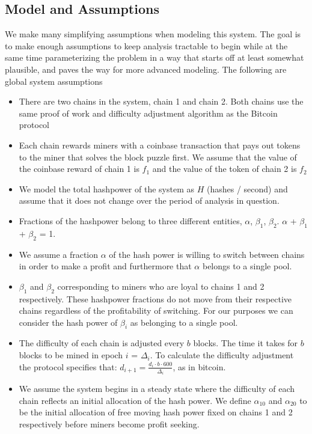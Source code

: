 \documentclass[12pt]{article}
\begin{document}
\subsection*{Model and Assumptions}
We make many simplifying assumptions when modeling this system.  The goal is to make enough assumptions to keep analysis tractable to begin while at the same time parameterizing the problem in a way that starts off at least somewhat plausible, and paves the way for more advanced modeling.  The following are global system assumptions 
\begin{itemize}
\item
There are two chains in the system, chain 1 and chain 2.  Both chains use the same proof of work and difficulty adjustment algorithm as the Bitcoin protocol
\item
Each chain rewards miners with a coinbase transaction that pays out tokens to the miner that solves the block puzzle first.  We assume that the value of the coinbase reward of chain 1 is $f_1$ and the value of the token of chain 2 is $f_2$
\item
We model the total hashpower of the system as $H$ (hashes / second) and assume that it does not change over the period of analysis in question.  
\item
Fractions of the hashpower belong to three different entities, $\alpha$, $\beta_1$, $\beta_2$.  $\alpha$ + $\beta_1$ + $\beta_2$ = 1.
\item
We assume a fraction $\alpha$ of the hash power is willing to switch between chains in order to make a profit and furthermore that $\alpha$ belongs to a single pool.
\item
$\beta_1$ and $\beta_2$ corresponding to miners who are loyal to chains 1 and 2 respectively.  These hashpower fractions do not move from their respective chains regardless of the profitability of switching.  For our purposes we can consider the hash power of $\beta_i$ as belonging to a single pool.
\item
The difficulty of each chain is adjusted every $b$ blocks.  The time it takes for $b$ blocks to be mined in epoch $i$ = $\Delta_i$.  To calculate the difficulty adjustment the protocol specifies that: $d_{i+1} = \frac{ d_i \cdot b \cdot 600 }{ \Delta_i}$, as in bitcoin.

\item
We assume the system begins in a steady state where the difficulty of each chain reflects an initial allocation of the hash power.  We define $\alpha_{10}$ and $\alpha_{20}$ to be the initial allocation of free moving hash power fixed on chains 1 and 2 respectively before miners become profit seeking.
\end{itemize}
\end{document}
